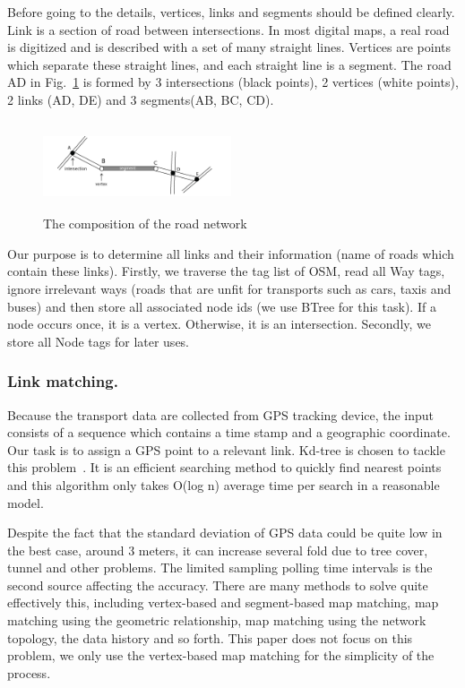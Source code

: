 \documentclass{acm_proc_article-sp}
\begin{document}
		\setlength{\parindent}{0.7cm} Before going to the details, vertices, links and segments should be defined clearly. Link is a section of road between intersections. In most digital maps, a real road is digitized and is described with a set of many straight lines. Vertices are points which separate these straight lines, and each straight line is a segment. The road AD in Fig.~\ref{fig:composition} is formed by 3 intersections (black points), 2 vertices (white points), 2 links (AD, DE) and 3 segments(AB, BC, CD).
		
\begin{figure}[h]
\centering
\includegraphics[height=100px,width=210px]{figure1}
\caption{The composition of the road network}
\label{fig:composition}
\end{figure}
	
		\setlength{\parindent}{0.7cm} Our purpose is to determine all links and their information (name of roads which contain these links). Firstly, we traverse the tag list of OSM, read all Way tags, ignore irrelevant ways (roads that are unfit for transports such as cars, taxis and buses) and then store all associated node ids (we use BTree for this task). If a node occurs once, it is a vertex. Otherwise, it is an intersection. Secondly, we store all Node tags for later uses.
	
\subsubsection{Link matching.}
	
	Because the transport data are collected from GPS tracking device, the input consists of a sequence which contains a time stamp and a geographic coordinate. Our task is to assign a GPS point to a relevant link. Kd-tree is chosen to tackle this problem~\cite{moh2013approximate}. It is an efficient searching method to quickly find nearest points and this algorithm only takes O(log n) average time per search in a reasonable model.
	
	\setlength{\parindent}{0.7cm} Despite the fact that the standard deviation of GPS data could be quite low in the best case, around 3 meters, it can increase several fold due to tree cover, tunnel and other problems. The limited sampling polling time intervals is the second source affecting the accuracy. There are many methods to solve quite effectively this, including vertex-based and segment-based map matching, map matching using the geometric relationship, map matching using the network topology, the data history and so forth. This paper does not focus on this problem, we only use the vertex-based map matching for the simplicity of the process.  
	
\end{document}
